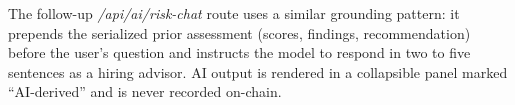 The follow-up \emph{/api/ai/risk-chat} route uses a similar grounding pattern: it prepends the serialized prior assessment (scores, findings, recommendation) before the user's question and instructs the model to respond in two to five sentences as a hiring advisor. AI output is rendered in a collapsible panel marked ``AI-derived'' and is never recorded on-chain.
